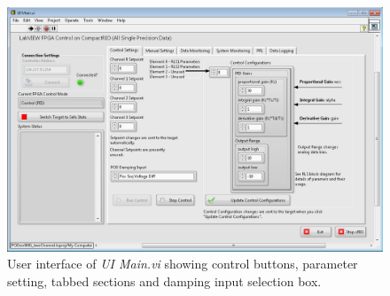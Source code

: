 \documentclass[conference]{IEEEtran}
\begin{document}
%
%
%
\begin{figure}[b]
	\centering
	\includegraphics[width=6in]{Screenshot.png} 
	\caption{User interface of \emph{UI Main.vi} showing control buttons, parameter setting, tabbed sections and damping input selection box.}
	\label{Screenshot}
\end{figure}
\end{document}
